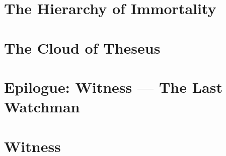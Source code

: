 \documentclass[11pt,a4paper,twoside]{book}
\begin{document}
\chapter{The Hierarchy of Immortality}




\chapter{The Cloud of Theseus}




\chapter{Epilogue: Witness --- The Last Watchman}


\chapter{Witness}





\backmatter







\appendix






\end{document}
